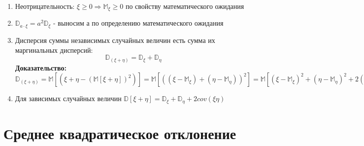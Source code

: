 \documentclass[../Main.tex]{subfiles}
\begin{document}
\begin{enumerate}
    \item Неотрицательность: \(\xi \geq 0 \Rightarrow \mathbb{M}_\xi \geq 0\) по свойству математического ожидания

    \item \(\mathbb{D}_{a\cdot \xi} = a^2 \mathbb{D}_\xi\) - выносим а по определению математического ожидания

    \item Дисперсия суммы независимых случайных величин есть сумма их маргинальных дисперсий:
    \[\mathbb{D}_{(\xi + \eta)} = \mathbb{D}_\xi + \mathbb{D}_\eta\]
    \textbf{Доказательство:}
    \(\mathbb{D}_{(\xi + \eta)} = \mathbb{M}[(\xi + \eta - (\mathbb{M}[\xi + \eta])^2)] = \mathbb{M}[((\xi - \mathbb{M}_\xi) + (\eta - \mathbb{M}_\eta))^2] = \mathbb{M}[(\xi - \mathbb{M}_\xi)^2 + (\eta - \mathbb{M}_\eta)^2 + 2 (\xi - \mathbb{M}_\xi) (\eta - \mathbb{M}_\eta)] = \mathbb{D}_\xi + \mathbb{D}_\eta + 0 = \mathbb{D}_\xi + \mathbb{D}_\eta
    \)
    
    

    \item Для зависимых случайных величин \(\mathbb{D}[\xi + \eta]= \mathbb{D}_\xi + \mathbb{D}_\eta + 2cov(\xi\eta)\)
    
\end{enumerate}


\section{Среднее квадратическое отклонение}
\end{document}
